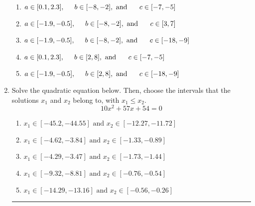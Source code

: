 \documentclass[14pt]{extbook}
\newcommand{\litem}[1]{\item#1\hspace*{-1cm}\rule{\textwidth}{0.4pt}}
\begin{document}
\begin{enumerate}
{\begin{center}
\end{center}
\begin{enumerate}[label=\Alph*.]
\item \( a \in [0.1, 2.3], \hspace*{5mm} b \in [-8, -2], \text{ and } \hspace*{5mm} c \in [-7, -5] \)
\item \( a \in [-1.9, -0.5], \hspace*{5mm} b \in [-8, -2], \text{ and } \hspace*{5mm} c \in [3, 7] \)
\item \( a \in [-1.9, -0.5], \hspace*{5mm} b \in [-8, -2], \text{ and } \hspace*{5mm} c \in [-18, -9] \)
\item \( a \in [0.1, 2.3], \hspace*{5mm} b \in [2, 8], \text{ and } \hspace*{5mm} c \in [-7, -5] \)
\item \( a \in [-1.9, -0.5], \hspace*{5mm} b \in [2, 8], \text{ and } \hspace*{5mm} c \in [-18, -9] \)

\end{enumerate} }
\litem{
Solve the quadratic equation below. Then, choose the intervals that the solutions $x_1$ and $x_2$ belong to, with $x_1 \leq x_2$.\[ 10x^{2} +57 x + 54 = 0 \]\begin{enumerate}[label=\Alph*.]
\item \( x_1 \in [-45.2, -44.55] \text{ and } x_2 \in [-12.27, -11.72] \)
\item \( x_1 \in [-4.62, -3.84] \text{ and } x_2 \in [-1.33, -0.89] \)
\item \( x_1 \in [-4.29, -3.47] \text{ and } x_2 \in [-1.73, -1.44] \)
\item \( x_1 \in [-9.32, -8.81] \text{ and } x_2 \in [-0.76, -0.54] \)
\item \( x_1 \in [-14.29, -13.16] \text{ and } x_2 \in [-0.56, -0.26] \)


\end{enumerate}}
\end{enumerate}
\end{document}
